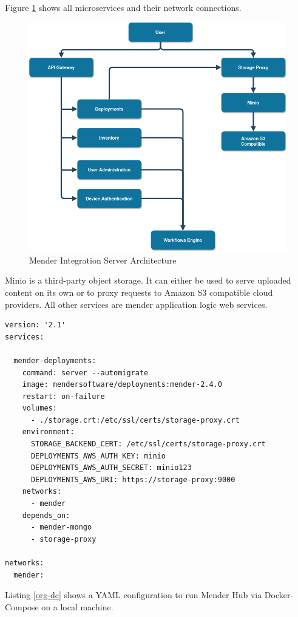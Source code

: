 Figure \ref{fig:mender-integration} shows all microservices and their network connections.
\begin{figure}
    \centering
    \includegraphics[scale=0.5]{images/integration-app.png}
    \caption{Mender Integration Server Architecture}
    \label{fig:mender-integration}
\end{figure}
Minio is a third-party object storage. It can either be used to serve uploaded content on its own or to proxy requests to Amazon S3 compatible cloud providers. All other services are mender application logic web services.
\newpage

\begin{code}
  \label{org-dc}
  \begin{verbatim}
version: '2.1'
services:

  mender-deployments:
    command: server --automigrate
    image: mendersoftware/deployments:mender-2.4.0
    restart: on-failure
    volumes:
      - ./storage.crt:/etc/ssl/certs/storage-proxy.crt
    environment:
      STORAGE_BACKEND_CERT: /etc/ssl/certs/storage-proxy.crt
      DEPLOYMENTS_AWS_AUTH_KEY: minio
      DEPLOYMENTS_AWS_AUTH_SECRET: minio123
      DEPLOYMENTS_AWS_URI: https://storage-proxy:9000
    networks:
      - mender
    depends_on:
      - mender-mongo
      - storage-proxy

networks:
  mender:
  \end{verbatim}
\end{code}
Listing \ref{org-dc} shows a YAML configuration to run Mender Hub via Docker-Compose on a local machine.


